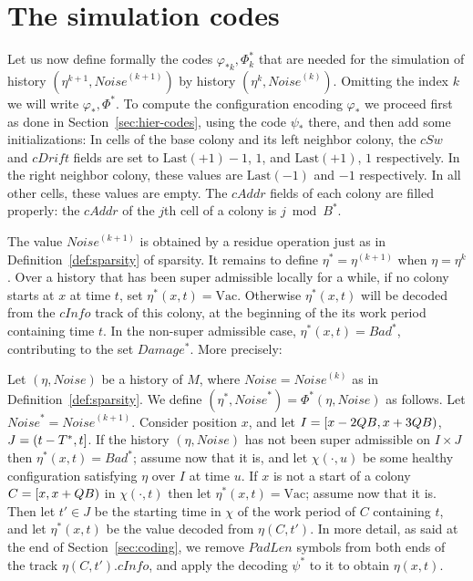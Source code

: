 \documentclass[12pt]{memoir}
\newcommand{\fld}[1]{\ensuremath{\textit{#1}}}
\def\B{B}
\newcommand{\Bad}{\mathit{Bad}}
\newcommand{\Damage}{Damage}
\newcommand{\Noise}{\mathit{Noise}}
\newcommand{\Tus}{T^{*}}
\newcommand{\cAddr}{\fld{cAddr}}
\newcommand{\cDrift}{\fld{cDrift}}
\newcommand{\cInfo}{\fld{cInfo}}
\newcommand{\cSweep}{\fld{cSw}}
\newcommand{\Last}{\mathrm{Last}}
\newcommand{\PadLen}{\mathit{PadLen}}
\newcommand{\Vacant}{\mathrm{Vac}}
\begin{document}
 

\section{The simulation codes}

Let us now define formally the codes \( \varphi_{*k},\Phi_{k}^{*} \) that are needed
for the simulation of history \( (\eta^{k+1},\Noise^{(k+1)}) \) by history \( (\eta^{k},\Noise^{(k)}) \).
Omitting the index \( k \) we will write \( \varphi_{*},\Phi^{*} \).
To compute the configuration encoding \( \varphi_{*} \) we proceed first as
done in Section~\ref{sec:hier-codes}, using the code \( \psi_{*} \) there,
and then add some initializations:
In cells of the base colony and its left neighbor  colony,
the \( \cSweep \) and \( \cDrift \) fields are set 
to \( \Last(+1)-1 \),  \( 1 \), and \( \Last(+1) \),  \( 1 \) respectively.
In the right neighbor colony, these values are \( \Last(-1) \) and \( -1 \) respectively.
In all other cells, these values are empty.
The \( \cAddr \) fields of each colony are filled properly:
the \( \cAddr \) of the \( j \)th cell of a colony
is \( j \bmod \B^* \).

The value \( \Noise^{(k+1)} \) is obtained by a residue operation
just as in Definition~\ref{def:sparsity} of sparsity.
It remains to define \( \eta^{*}=\eta^{(k+1)} \) when \( \eta=\eta^{k} \).
Over a history that has been super admissible locally for a while,
if no colony starts at \( x \) at time \( t \), set \( \eta^{*}(x,t)=\Vacant \).
Otherwise \( \eta^{*}(x,t) \) will be decoded from
the \( \cInfo \) track of this colony, at the beginning of the its work period 
containing time \( t \).
In the non-super admissible case, \( \eta^{*}(x,t)=\Bad^{*} \), contributing to
the set \( \Damage^{*} \).
More precisely:

\begin{definition}\label{def:damage-scaleup}
Let \( (\eta,\Noise) \) be a history of \( M \), where \( \Noise=\Noise^{(k)} \)
as in Definition~\ref{def:sparsity}.
We define \( (\eta^{*},\Noise^{*})=\Phi^{*}(\eta,\Noise) \) as follows.
Let \( \Noise^{*}=\Noise^{{(k+1)}} \).
Consider position \( x \), and let \( I=[x-2QB,x+3QB) \),
\( J=\rint{t-\Tus}{t} \).
If the history \( (\eta,\Noise) \) has not been super admissible on \( I\times J \)
then \( \eta^{*}(x,t)=\Bad^{*} \); assume now that it is, and let
\( \chi(\cdot,u) \) be some healthy configuration satisfying \( \eta \) over 
\( I \) at time \( u \).
If \( x \) is not a start of a colony \( C=\lint{x}{x+Q\B} \) in \( \chi(\cdot,t) \)
then let \( \eta^{*}(x,t)=\Vacant \); assume now that it is.
Then let \( t'\in J \) be the starting time in \( \chi \) of the work period of \( C \)
containing \( t \),
and let \( \eta^{*}(x,t) \) be the value decoded from \( \eta(C,t') \).
In more detail, as said at the end of Section~\ref{sec:coding}, 
we remove \( \PadLen \) symbols from both ends of 
the track \( \eta(C,t').\cInfo \), and apply 
the decoding \( \psi^{*} \) to it to obtain \( \eta(x,t) \).
\end{definition}




\end{document}
